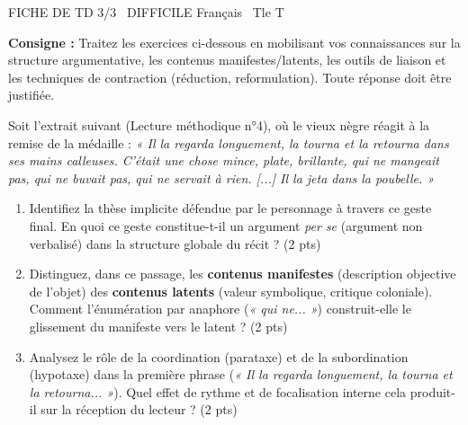 \documentclass[11pt]{article}
\begin{document}
\begin{tcolorbox}[enhanced,colback=popink,colframe=popink,arc=10pt,boxrule=0pt,left=12pt,right=12pt,top=9pt,bottom=9pt]
{\color{white}\popxbold\small FICHE DE TD 3/3 \textbullet\ DIFFICILE \hfill Français \textbullet\ Tle T\par}
\end{tcolorbox}
\vspace{4pt}
\noindent \textbf{Consigne :} Traitez les exercices ci-dessous en mobilisant vos connaissances sur la structure argumentative, les contenus manifestes/latents, les outils de liaison et les techniques de contraction (réduction, reformulation). Toute réponse doit être justifiée.

\begin{exercice}
Soit l'extrait suivant (Lecture méthodique n°4), où le vieux nègre réagit à la remise de la médaille : 
\textit{« Il la regarda longuement, la tourna et la retourna dans ses mains calleuses. C'était une chose mince, plate, brillante, qui ne mangeait pas, qui ne buvait pas, qui ne servait à rien. [...] Il la jeta dans la poubelle. »}

\begin{enumerate}
    \item Identifiez la thèse implicite défendue par le personnage à travers ce geste final. En quoi ce geste constitue-t-il un argument \textit{per se} (argument non verbalisé) dans la structure globale du récit ? (2 pts)
    \item Distinguez, dans ce passage, les \textbf{contenus manifestes} (description objective de l'objet) des \textbf{contenus latents} (valeur symbolique, critique coloniale). Comment l'énumération par anaphore (\textit{« qui ne... »}) construit-elle le glissement du manifeste vers le latent ? (2 pts)
    \item Analysez le rôle de la coordination (parataxe) et de la subordination (hypotaxe) dans la première phrase (\textit{« Il la regarda longuement, la tourna et la retourna... »}). Quel effet de rythme et de focalisation interne cela produit-il sur la réception du lecteur ? (2 pts)
\end{enumerate}
\end{exercice}
\end{document}
